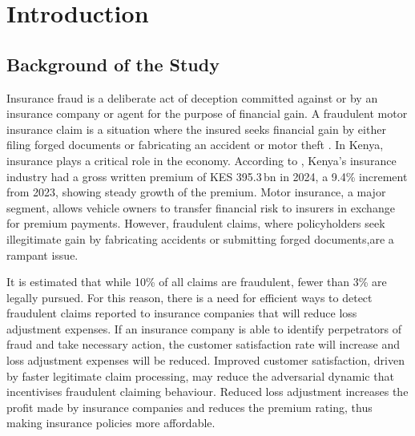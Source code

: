 \documentclass[12pt,a4paper,oneside]{report}
\numberwithin{equation}{chapter}
\begin{document}
\newpage
\tableofcontents
\clearpage
\listoffigures
\clearpage
\listoftables
\clearpage

\chapter{Introduction}

\section{Background of the Study}

Insurance fraud is a deliberate act of deception committed against or by an insurance company
or agent for the purpose of financial gain. A fraudulent motor insurance claim is a situation
where the insured seeks financial gain by either filing forged documents or fabricating an accident
or motor theft \cite{mainafraud}. In Kenya, insurance plays a critical role in the economy.
According to \cite{Cytonn2025KenyaListedInsurance}, Kenya's insurance industry had a gross
written premium of KES 395.3\,bn in 2024, a 9.4\% increment from 2023, showing steady growth
of the premium. Motor insurance, a major segment, allows vehicle owners to transfer financial risk
to insurers in exchange for premium payments. However, fraudulent claims, where policyholders
seek illegitimate gain by fabricating accidents or submitting forged documents,are a rampant issue.

It is estimated that while 10\% \cite{itri2019performance} of all claims are fraudulent, fewer
than 3\% \cite{kowshalya2018predicting} are legally pursued. For this reason, there is a need
for efficient ways to detect fraudulent claims reported to insurance companies that will reduce
loss adjustment expenses. If an insurance company is able to identify perpetrators of fraud and
take necessary action, the customer satisfaction rate will increase and loss adjustment expenses
will be reduced. Improved customer satisfaction, driven by faster legitimate claim processing, may
reduce the adversarial dynamic that incentivises fraudulent claiming behaviour. Reduced loss
adjustment increases the profit made by insurance companies and reduces the premium rating, thus
making insurance policies more affordable.
\end{document}
